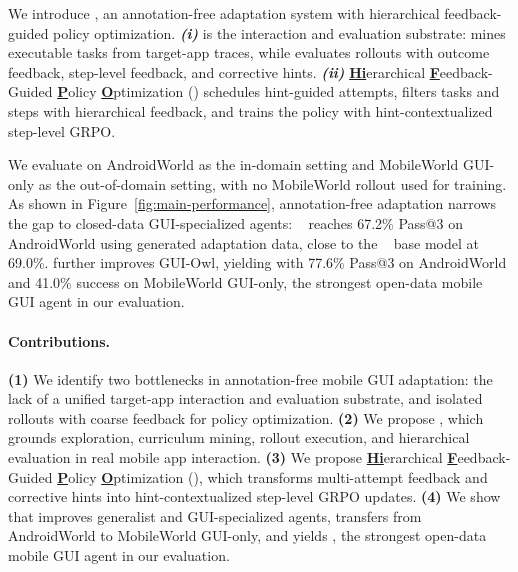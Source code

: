 We introduce \textbf{\ourmethod}, an annotation-free adaptation system with hierarchical feedback-guided policy optimization. \textbf{\emph{(i)}} \textbf{\mobilegym} is the interaction and evaluation substrate: \curriculum mines executable tasks from target-app traces, while \critic evaluates rollouts with outcome feedback, step-level feedback, and corrective hints. \textbf{\emph{(ii)}} \textbf{\underline{Hi}}erarchical \textbf{\underline{F}}eedback-Guided \textbf{\underline{P}}olicy \textbf{\underline{O}}ptimization (\textbf{\hifpo}) schedules hint-guided attempts, filters tasks and steps with hierarchical feedback, and trains the policy with hint-contextualized step-level GRPO.

We evaluate \ourmethod on AndroidWorld \citep{rawles2024androidworld} as the in-domain setting and MobileWorld GUI-only \citep{kong2026mobileworld} as the out-of-domain setting, with no MobileWorld rollout used for training. As shown in Figure~\ref{fig:main-performance}, annotation-free adaptation narrows the gap to closed-data GUI-specialized agents: ~\citep{bai2025qwen3} reaches 67.2\% Pass@3 on AndroidWorld using generated adaptation data, close to the ~\citep{xu2026mobile} base model at 69.0\%. \ourmethod further improves GUI-Owl, yielding  with 77.6\% Pass@3 on AndroidWorld and 41.0\% success on MobileWorld GUI-only, the strongest open-data mobile GUI agent in our evaluation.

\paragraph{Contributions.}
\textbf{(1)} We identify two bottlenecks in annotation-free mobile GUI adaptation: the lack of a unified target-app interaction and evaluation substrate, and isolated rollouts with coarse feedback for policy optimization.
\textbf{(2)} We propose \textbf{\mobilegym}, which grounds exploration, curriculum mining, rollout execution, and hierarchical evaluation in real mobile app interaction.
\textbf{(3)} We propose \textbf{\underline{Hi}}erarchical \textbf{\underline{F}}eedback-Guided \textbf{\underline{P}}olicy \textbf{\underline{O}}ptimization (\textbf{\hifpo}), which transforms multi-attempt feedback and corrective hints into hint-contextualized step-level GRPO updates.
\textbf{(4)} We show that \ourmethod improves generalist and GUI-specialized agents, transfers from AndroidWorld to MobileWorld GUI-only, and yields , the strongest open-data mobile GUI agent in our evaluation.
